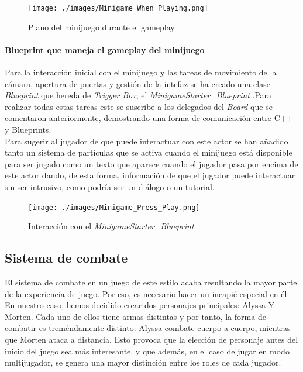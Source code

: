 \begin{figure}[H]
  \centering
  \texttt{[image: ./images/Minigame\_When\_Playing.png]}
  \caption{Plano del minijuego durante el gameplay}
  \label{GameplayMinigame}
\end{figure}

\paragraph{Blueprint que maneja el gameplay del minijuego}
Para la interacción inicial con el minijuego y las tareas de movimiento de la cámara, apertura de puertas y gestión de la intefaz se ha creado una clase \textit{Blueprint} que hereda de \textit{Trigger Box}, el \textit{MinigameStarter\_Blueprint} .Para realizar todas estas tareas este se suscribe a los delegados del \textit{Board} que se comentaron anteriormente, demostrando una forma de comunicación entre C++ y Blueprints. \\

Para sugerir al jugador de que puede interactuar con este actor se han añadido tanto un sistema de partículas que se activa cuando el minijuego está disponible para ser jugado como un texto que aparece cuando el jugador pasa por encima de este actor dando, de esta forma, información de que el jugador puede interactuar sin ser intrusivo, como podría ser un diálogo o un tutorial.


\begin{figure}[H]
  \centering
  \texttt{[image: ./images/Minigame\_Press\_Play.png]}
  \caption{Interacción con el \textit{MinigameStarter_Blueprint}}
  \label{Minigamestarterinteraction}
\end{figure}

\subsection{Sistema de combate}
El sistema de combate en un juego de este estilo acaba resultando la mayor parte de la experiencia de juego. Por eso, es necesario hacer un incapié especial en él.
En nuestro caso, hemos decidido crear dos personajes principales: Alyssa Y Morten. Cada uno de ellos tiene armas distintas y por tanto, la forma de combatir es treméndamente distinto: Alyssa combate cuerpo a cuerpo, mientras que Morten ataca a distancia. Esto provoca que la elección de personaje antes del inicio del juego sea más interesante, y que además, en el caso de jugar en modo multijugador, se genera una mayor distinción entre los roles de cada jugador. 
\\

